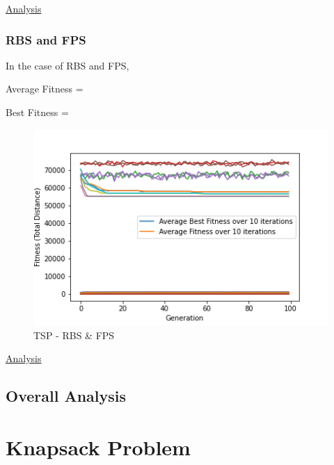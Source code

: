\documentclass[11pt, letterpaper]{article}
\begin{document}
\underline{Analysis}
\subsubsection {RBS and FPS}
In the case of RBS and FPS,

Average Fitness = 

Best Fitness = 
\begin{figure}[H]
    \centering
    \includegraphics[scale = 0.6]{images/tsp_rb_fp.png}
    \caption {TSP - RBS \& FPS}
    \label {fig:tpsBF}
\end{figure}

\underline{Analysis}
\subsection {Overall Analysis}

\section{Knapsack Problem}
\end{document}
